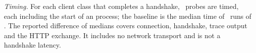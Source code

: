 \emph{Timing.} For each client class that completes a handshake, \TlsProbeN\ probes are timed, each including the start of an  process; the baseline is the median time of \TlsBaselineN\ runs of . The reported difference of medians covers connection, handshake, trace output and the HTTP exchange. It includes no network transport and is not a handshake latency.
\clearpage
